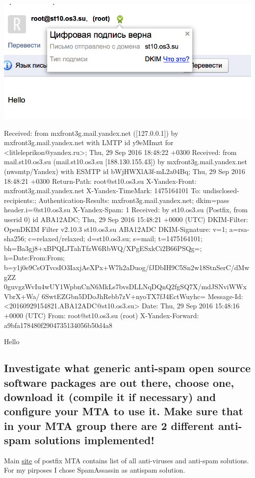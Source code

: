 \documentclass[a4paper,11pt]{article}
\begin{document}
\includegraphics{mail_delivered}
\begin{bashcode}
Received: from mxfront3g.mail.yandex.net ([127.0.0.1])
  by mxfront3g.mail.yandex.net with LMTP id y9eMImzt
  for <litleleprikon@yandex.ru>; Thu, 29 Sep 2016 18:48:22 +0300
Received: from mail.st10.os3.su (mail.st10.os3.su [188.130.155.43])
  by mxfront3g.mail.yandex.net (nwsmtp/Yandex) with ESMTP id bWjHWXlA3f-mL2a04Bq;
  Thu, 29 Sep 2016 18:48:21 +0300
Return-Path: root@st10.os3.su
X-Yandex-Front: mxfront3g.mail.yandex.net
X-Yandex-TimeMark: 1475164101
To: undisclosed-recipients:;
Authentication-Results: mxfront3g.mail.yandex.net; dkim=pass header.i=@st10.os3.su
X-Yandex-Spam: 1
Received: by st10.os3.su (Postfix, from userid 0)
  id ABA12ADC; Thu, 29 Sep 2016 15:48:21 +0000 (UTC)
DKIM-Filter: OpenDKIM Filter v2.10.3 st10.os3.su ABA12ADC
DKIM-Signature: v=1; a=rsa-sha256; c=relaxed/relaxed; d=st10.os3.su; s=mail;
  t=1475164101; bh=Ba3gj8+xBPQLJTahTfzW6RbWQ/XPgESxkCi2B66PSQg=;
  h=Date:From:From;
  b=y1j0e9CsOTvcsIO3IaxjAeXPx+W7h2aDuog/fJDbIH9C5Sn2w18StnSerC/dMwgZZ
   0guvgzWvIu4wUY1WpbnCnN6MkLs7bvsDLLNqDQnQ2fgSQ7X/mdJSNviWWxVbrX+Wa/
   6SwtEZGbn5DDoJhRebb7zV+nyoTX7fJ4EctWuyhc=
Message-Id: <20160929154821.ABA12ADC@st10.os3.su>
Date: Thu, 29 Sep 2016 15:48:16 +0000 (UTC)
From: root@st10.os3.su (root)
X-Yandex-Forward: a9bfa178480f2904735134056b50d4a8

Hello
\end{bashcode}

\subsection{Investigate what generic anti-spam open source software packages are out there, choose one, download it (compile it if necessary) and configure your MTA to use it. Make sure that in your MTA group there are 2 different anti-spam solutions implemented!}
Main \href{http://www.postfix.org/addon.html}{site} of postfix MTA contains list of all anti-viruses and anti-spam solutions. For my pirposes I chose SpamAssassin as antispam solution.
\end{document}
